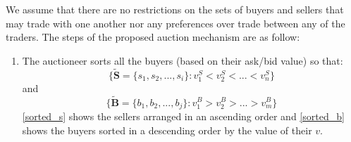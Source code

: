 We assume that there are no restrictions on the sets of buyers and sellers that may trade with one another nor any preferences over trade between any of the traders. The steps of the proposed auction mechanism are as follow:
\begin{enumerate}
\item The auctioneer sorts all the buyers (based on their ask/bid value) so that:
\begin{equation}
\{\tilde{\mathbf{S}} = \{s_{1}, s_{2}, ...,s_{i}\} : v^S_{1}<v^S_{2}<...<v^S_{n}\}
\label{sorted_s}
\end{equation}
and
\begin{equation}
\{\tilde{\mathbf{B}} = \{b_{1}, b_{2}, ...,b_{j}\} : v^B_{1}>v^B_{2}>...>v^B_{m}\}
\label{sorted_b}
\end{equation}
\autoref{sorted_s} shows the sellers arranged in an ascending order and \autoref{sorted_b} shows the buyers sorted in a descending order by the value of their $v$.


\end{enumerate}
